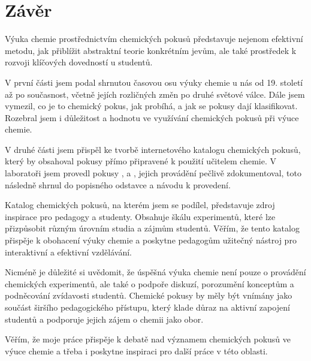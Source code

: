 \newpage
\chapter*{Závěr}

Výuka chemie prostřednictvím chemických pokusů představuje nejenom efektivní metodu, jak přiblížit abstraktní teorie konkrétním jevům, ale také prostředek k rozvoji klíčových dovedností u studentů.

V první části jsem podal shrnutou časovou osu výuky chemie u nás od 19. století až po současnost, včetně jejích rozličných změn po druhé světové válce. Dále jsem vymezil, co je to chemický pokus, jak probíhá, a jak se pokusy dají klasifikovat. Rozebral jsem i důležitost a hodnotu ve využívání chemických pokusů při výuce chemie.

V druhé části jsem přispěl ke tvorbě internetového katalogu chemických pokusů, který by obsahoval pokusy přímo připravené k použití učitelem chemie. V laboratoři jsem provedl pokusy ,  a , jejich provádění pečlivě zdokumentoval, toto následně shrnul do popisného odstavce a návodu k provedení.

Katalog chemických pokusů, na kterém jsem se podílel, představuje zdroj inspirace pro pedagogy a studenty. Obsahuje škálu experimentů, které lze přizpůsobit různým úrovním studia a zájmům studentů. Věřím, že tento katalog přispěje k obohacení výuky chemie a poskytne pedagogům užitečný nástroj pro interaktivní a efektivní vzdělávání.

Nicméně je důležité si uvědomit, že úspěšná výuka chemie není pouze o provádění chemických experimentů, ale také o podpoře diskuzí, porozumění konceptům a podněcování zvídavosti studentů. Chemické pokusy by měly být vnímány jako součást širšího pedagogického přístupu, který klade důraz na aktivní zapojení studentů a podporuje jejich zájem o chemii jako obor.

Věřím, že moje práce přispěje k debatě nad významem chemických pokusů ve výuce chemie a třeba i poskytne inspiraci pro další práce v této oblasti.
